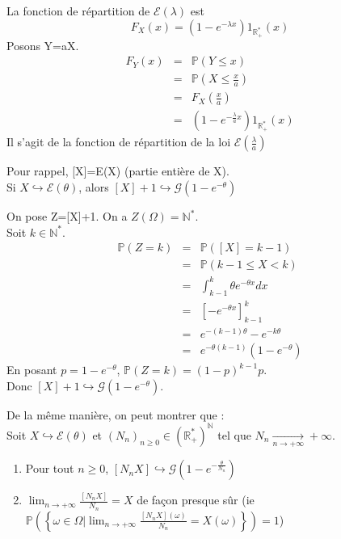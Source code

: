 \begin{dem}
La fonction de répartition de $\mathcal{E}(\lambda)$ est \[F_X(x) = \left( 1-e^{-\lambda x} \right) 1_{\mathbb{R}_+^*} (x)\]
Posons Y=aX. \\
\begin{eqnarray*}
F_Y(x) &=& \mathbb{P}(Y \leq x) \\
&=& \mathbb{P} \left( X \leq \frac{x}{a} \right) \\
&=& F_X \left( \frac{x}{a} \right) \\
&=& \left( 1-e^{-\frac{\lambda}{a} x} \right) 1_{\mathbb{R}_+^*} (x)
\end{eqnarray*}
Il s'agit de la fonction de répartition de la loi $\mathcal{E}(\frac{\lambda}{a})$
\end{dem}

\begin{Prop}
Pour rappel, [X]=E(X) (partie entière de X). \\
Si $X\hookrightarrow \mathcal{E}(\theta)$, alors $[X]+1 \hookrightarrow \mathcal{G}(1-e^{-\theta})$
\end{Prop}

\begin{dem}
On pose Z=[X]+1. On a $Z(\Omega)=\mathbb{N}^*$. \\
Soit $k\in \mathbb{N}^*$.
\begin{eqnarray*}
\mathbb{P}(Z=k) &=& \mathbb{P}([X]=k-1) \\
&=& \mathbb{P}(k-1 \leq X < k) \\
&=& \int_{k-1}^k \theta e^{-\theta x} dx \\
&=& \left[ -e^{-\theta x} \right]_{k-1}^k \\
&=& e^{-(k-1) \theta} - e^{-k \theta} \\
&=& e^{-\theta (k-1)} \left( 1-e^{- \theta} \right)
\end{eqnarray*}
En posant $p=1-e^{-\theta}$, $\mathbb{P}(Z=k) = (1-p)^{k-1} p$. \\
Donc $[X]+1 \hookrightarrow \mathcal{G}(1-e^{-\theta})$.
\end{dem}

\begin{Prop}
De la même manière, on peut montrer que : \\
Soit $X \hookrightarrow \mathcal{E}(\theta)$ et $(N_n)_{n\geq 0} \in \left( \mathbb{R}_+^* \right)^{\mathbb{N}}$ tel que $N_n \xrightarrow[n \rightarrow +\infty]{} +\infty$.
\begin{enumerate}
\item Pour tout $n \geq 0$, $[N_n X] \hookrightarrow \mathcal{G}\left( 1-e^{-\frac{\theta}{N_n}} \right)$ 
\item $\lim_{n \rightarrow +\infty} \frac{[N_n X]}{N_n} = X$ de façon presque sûr (ie $\mathbb{P} \left( \left\{ \omega \in \Omega | \lim_{n\rightarrow +\infty} \frac{[N_n X](\omega)}{N_n}=X(\omega) \right\} \right) =1$)
\end{enumerate}
\end{Prop}


